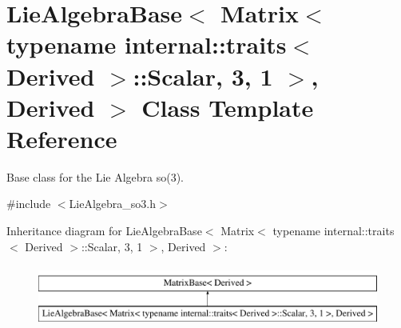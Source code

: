 \hypertarget{class_lie_algebra_base_3_01_matrix_3_01typename_01internal_1_1traits_3_01_derived_01_4_1_1_scalabfa0bdce6d9781ee940346c3f6d91f4e}{}\section{Lie\+Algebra\+Base$<$ Matrix$<$ typename internal\+:\+:traits$<$ Derived $>$\+:\+:Scalar, 3, 1 $>$, Derived $>$ Class Template Reference}
\label{class_lie_algebra_base_3_01_matrix_3_01typename_01internal_1_1traits_3_01_derived_01_4_1_1_scalabfa0bdce6d9781ee940346c3f6d91f4e}


Base class for the Lie Algebra so(3).  




{\ttfamily \#include $<$Lie\+Algebra\+\_\+so3.\+h$>$}

Inheritance diagram for Lie\+Algebra\+Base$<$ Matrix$<$ typename internal\+:\+:traits$<$ Derived $>$\+:\+:Scalar, 3, 1 $>$, Derived $>$\+:\begin{figure}[H]
\begin{center}
\leavevmode
\includegraphics[height=2.000000cm]{class_lie_algebra_base_3_01_matrix_3_01typename_01internal_1_1traits_3_01_derived_01_4_1_1_scalabfa0bdce6d9781ee940346c3f6d91f4e}
\end{center}
\end{figure}
